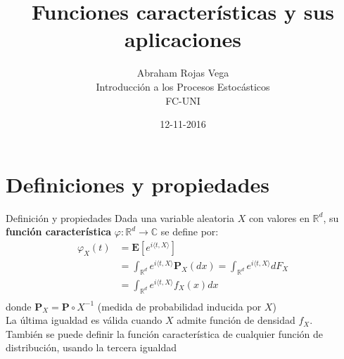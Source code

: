 \documentclass{beamer}
\newcommand{\ds}{\displaystyle}
\newcommand{\R}{\mathbb{R}}
\newcommand{\Rd}{\R^{d}}
\newcommand{\vp}{\varphi}
\newcommand{\E}{\mathbf{E}}
\newcommand{\pro}{\mathbf{P}}
\begin{document}
	
\title{Funciones características y sus aplicaciones}
\author{Abraham Rojas Vega\\
		{Introducción a los Procesos Estocásticos}\\
		{FC-UNI}}
\date{12-11-2016} 
\frame{\titlepage}
	

\section{Definiciones y propiedades}

\begin{frame}{Definición y propiedades}
	Dada una variable aleatoria $X$ con valores en $\R^{d}$, su {\bf función característica} $\vp: \R^{d} \rightarrow \mathbb{C} $ se define por: 
	 \begin{align*}
	\vp_{X}(t)  &= \E [e^{i \langle t,X \rangle }] \\
				&= \ds \int _{\R^{d} }e^{i \langle t,X \rangle} \pro_{X} (dx) =\ds \int _{\R^{d} }e^{i \langle t,X \rangle} dF_{X} \\			
				&=  \ds \int_{\Rd} e^{i \langle t, X \rangle} f_{X}(x) dx \\
	\end{align*}
	donde  $\pro_{X}= \pro \circ X^{-1} $ (medida de probabilidad inducida por $X$) \\
	La última igualdad es válida cuando $X$ admite función de densidad $f_{X}$. \\
	También se puede definir la función característica de cualquier función de distribución, usando la tercera igualdad

\end{frame}
\end{document}
